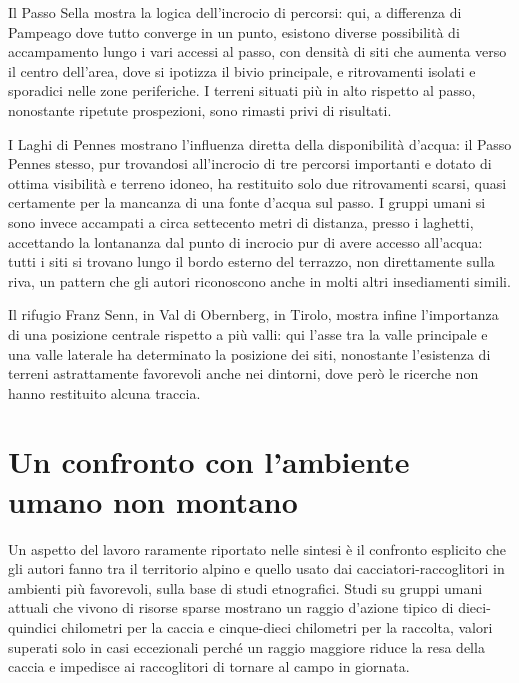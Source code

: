 Il Passo Sella mostra la logica dell'incrocio di percorsi: qui, a differenza di Pampeago dove tutto converge in un punto, esistono diverse possibilità di accampamento lungo i vari accessi al passo, con densità di siti che aumenta verso il centro dell'area, dove si ipotizza il bivio principale, e ritrovamenti isolati e sporadici nelle zone periferiche. I terreni situati più in alto rispetto al passo, nonostante ripetute prospezioni, sono rimasti privi di risultati.

I Laghi di Pennes mostrano l'influenza diretta della disponibilità d'acqua: il Passo Pennes stesso, pur trovandosi all'incrocio di tre percorsi importanti e dotato di ottima visibilità e terreno idoneo, ha restituito solo due ritrovamenti scarsi, quasi certamente per la mancanza di una fonte d'acqua sul passo. I gruppi umani si sono invece accampati a circa settecento metri di distanza, presso i laghetti, accettando la lontananza dal punto di incrocio pur di avere accesso all'acqua: tutti i siti si trovano lungo il bordo esterno del terrazzo, non direttamente sulla riva, un pattern che gli autori riconoscono anche in molti altri insediamenti simili.

Il rifugio Franz Senn, in Val di Obernberg, in Tirolo, mostra infine l'importanza di una posizione centrale rispetto a più valli: qui l'asse tra la valle principale e una valle laterale ha determinato la posizione dei siti, nonostante l'esistenza di terreni astrattamente favorevoli anche nei dintorni, dove però le ricerche non hanno restituito alcuna traccia.

\section{Un confronto con l'ambiente umano non montano}

Un aspetto del lavoro raramente riportato nelle sintesi è il confronto esplicito che gli autori fanno tra il territorio alpino e quello usato dai cacciatori-raccoglitori in ambienti più favorevoli, sulla base di studi etnografici. Studi su gruppi umani attuali che vivono di risorse sparse mostrano un raggio d'azione tipico di dieci-quindici chilometri per la caccia e cinque-dieci chilometri per la raccolta, valori superati solo in casi eccezionali perché un raggio maggiore riduce la resa della caccia e impedisce ai raccoglitori di tornare al campo in giornata.

